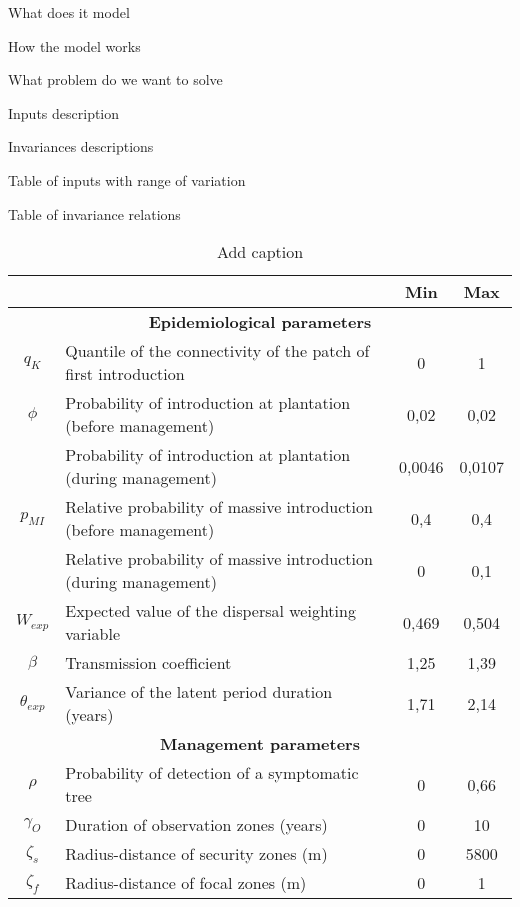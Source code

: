 What does it model

How the model works

What problem do we want to solve

Inputs description

Invariances descriptions

Table of inputs with range of variation

Table of invariance relations

\begin{table}[htbp]
	\centering
	\caption{Add caption}
	\begin{tabular}{|c|p{33.785em}|c|c|}
		\cmidrule{3-4}    \multicolumn{1}{c}{} & \multicolumn{1}{c|}{} & \textbf{Min} & \textbf{Max} \\
		\midrule
		\multicolumn{4}{|c|}{\textbf{Epidemiological parameters}} \\
		\midrule
		$q_{K}$    & Quantile of the connectivity of the patch of first introduction & 0     & 1 \\
		\midrule
		$\phi$ & Probability of introduction at plantation (before management) & 0,02  & 0,02 \\
		\cmidrule{2-4}          & Probability of introduction at plantation (during management) & 0,0046 & 0,0107 \\
		\midrule
		$p_{MI}$ & Relative probability of massive introduction (before management) & 0,4   & 0,4 \\
		\cmidrule{2-4}          & Relative probability of massive introduction  (during management) & 0     & 0,1 \\
		\midrule
		$W_{exp}$  & Expected value of the dispersal weighting variable & 0,469 & 0,504 \\
		\midrule
		$\beta$     & Transmission coefficient & 1,25  & 1,39 \\
		\midrule
		$\theta_{exp}$  & Variance of the latent period duration (years) & 1,71  & 2,14 \\
		\midrule
		\multicolumn{4}{|c|}{\textbf{Management parameters}} \\
		\midrule
		$\rho$    & Probability of detection of a symptomatic tree & 0     & 0,66 \\
		\midrule
		$\gamma_{O}$    & Duration of observation zones (years) & 0     & 10 \\
		\midrule
		$\zeta_{s}$   & Radius-distance of security zones (m) & 0     & 5800 \\
		\midrule
		$\zeta_{f}$  & Radius-distance of focal zones (m) & 0     & 1 \\

\end{tabular}
\end{table}
